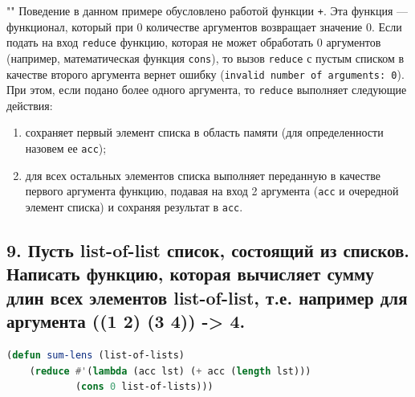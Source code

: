\documentclass[12pt]{report}
\begin{document}
""\newline
Поведение в данном примере обусловлено работой функции \texttt{+}. Эта функция --- функционал, который при 0 количестве аргументов возвращает значение 0. Если подать на вход \texttt{reduce} функцию, которая не может обработать 0 аргументов (например, математическая функция \texttt{cons}), то вызов \texttt{reduce} с пустым списком в качестве второго аргумента вернет ошибку (\texttt{invalid number of arguments: 0}). При этом, если подано более одного аргумента, то \texttt{reduce} выполняет следующие действия:
\begin{enumerate}
	\item сохраняет первый элемент списка в область памяти (для определенности назовем ее \texttt{acc});
	\item для всех остальных элементов списка выполняет переданную в качестве первого аргумента функцию, подавая на вход 2 аргумента (\texttt{acc} и очередной элемент списка) и сохраняя результат в \texttt{acc}.
\end{enumerate}

\subsection*{9. Пусть list-of-list список, состоящий из списков. Написать функцию, которая вычисляет
	сумму длин всех элементов list-of-list, т.е. например для аргумента ((1 2) (3 4)) -> 4.}

\begin{lstlisting}[label=6xd, caption=Решение задания №9, language=lisp]
(defun sum-lens (list-of-lists)
	(reduce #'(lambda (acc lst) (+ acc (length lst)))
			(cons 0 list-of-lists)))

\end{lstlisting}
\end{document}
